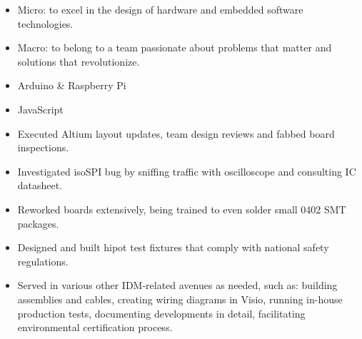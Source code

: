 \documentclass{resume}
\begin{document}




\begin{itemize}[parsep=0.5ex]
  \item Micro: to excel in the design of hardware and embedded software technologies.
  \item Macro: to belong to a team passionate about problems that matter and solutions that revolutionize.
\end{itemize}


\begin{itemize}[parsep=0.5ex]
  \item %
  Arduino \& Raspberry Pi

  \item %
  JavaScript

\end{itemize}


\begin{itemize}
  \item Executed Altium layout updates, team design reviews and fabbed board inspections.
  \item Investigated isoSPI bug by sniffing traffic with oscilloscope and consulting IC datasheet.
  \item Reworked boards extensively, being trained to even solder small 0402 SMT packages.
  \item Designed and built hipot test fixtures that comply with national safety regulations.
  \item Served in various other IDM-related avenues as needed, such as: building assemblies and cables, creating wiring diagrams in Visio, running in-house production tests, documenting developments in detail, facilitating environmental certification process.
\end{itemize}
\end{document}
